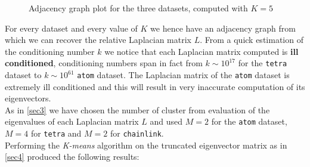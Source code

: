 \begin{figure}[H]
    \caption{Adjacency graph plot for the three datasets, computed with \(K=5\)}
    \label{adjacency_3d}
\end{figure}

\noindent For every dataset and every value of \(K\) we hence have an adjacency graph from which we can recover the relative Laplacian matrix \(L\). From a quick estimation of the conditioning number \(k\) we notice that each Laplacian matrix computed is \textbf{ill conditioned}, conditioning numbers span in fact from \(k \sim 10^{17}\) for the \texttt{tetra} dataset to \(k \sim 10^{61}\) \texttt{atom} dataset. 
The Laplacian matrix of the \texttt{atom} dataset is extremely ill conditioned and this will result in very inaccurate computation of its eigenvectors.
\\
As in \ref{sec3} we have chosen the number of cluster from evaluation of the eigenvalues of each Laplacian matrix \(L\) and used \(M=2\) for the \texttt{atom} dataset, \(M=4\) for \texttt{tetra} and \(M=2\) for \texttt{chainlink}.
\\
Performing the \textit{K-means} algorithm on the truncated eigenvector matrix as in \ref{sec4} produced the following results:

